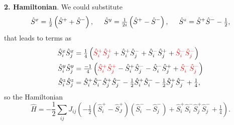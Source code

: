 \textbf{2. Hamiltonian}. We could substitute
\begin{equation*}
	\hat{S}^x = \tfrac{1}{2}\left(\hat{S}^+ + \hat{S}^-\right),
	\hspace{5 mm} 
	\hat{S}^y = \tfrac{1}{2i}\left(\hat{S}^+ - \hat{S}^-\right),
	\hspace{5 mm} 
	\hat{S}^z = \hat{S}^+ \hat{S}^- - \tfrac{1}{2},
\end{equation*}
that leads to terms as
\begin{align*}
	\hat{S}^x_i \hat{S}^x_j &= \tfrac{1}{4}\left(
		\textcolor{red}{\hat{S}^{+}_{i} \hat{S}^{+}_{j}} + \hat{S}^{+}_{i} \hat{S}^{-}_{j}  + \hat{S}^{-}_{i} \hat{S}^{+}_{j} + \textcolor{red}{\hat{S}^{-}_{i} \hat{S}^{-}_{j} }
	\right) \\
	\hat{S}^{y}_{i} \hat{S}^{y}_{j} &= \tfrac{-1}{4}\left(
		\textcolor{red}{\hat{S}^{+}_{i} \hat{S}^{+}_{j}} - \hat{S}^{+}_{i} \hat{S}^{-}_{j} - \hat{S}^{-}_{i} \hat{S}^{+}_{j} + 
		\textcolor{red}{\hat{S}^{-}_{i} \hat{S}^{-}_{j} }
	\right) \\
	\hat{S}^{z}_{i} \hat{S}^{z}_{j} &= \hat{S}^{+}_{i} \hat{S}^{-}_{i} \hat{S}^{+}_{j} \hat{S}^{-}_{j} - \tfrac{1}{2} \hat{S}^{+}_{i} \hat{S}^{-}_{i} - \tfrac{1}{2} \hat{S}^{+}_{j} \hat{S}^{-}_{j} + \tfrac{1}{4},
\end{align*}
so the Hamiltonian 
\begin{equation*}
	\hat{H} = -\frac{1}{2} \sum_{ij} J_{ij} \left(
		-\tfrac{1}{2} \left(\hat{S}^{+}_{i} - \hat{S}^{+}_{J} \right) \left(\hat{S}^{-}_{i} - \hat{S}^{-}_{j} \right) + \hat{S}^{+}_{i} \hat{S}^{-}_{i} \hat{S}^{+}_{j} \hat{S}^{-}_{j} + \tfrac{1}{4}
	\right).
\end{equation*}

